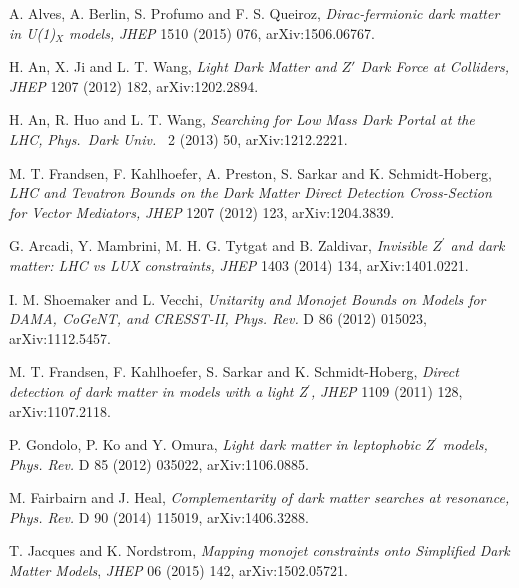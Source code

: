  A. Alves, A. Berlin, S. Profumo and F. S. Queiroz,
\emph{Dirac-fermionic dark matter in U(1)$_{X}$ models,}
  \emph{JHEP} 1510 (2015) 076,
  arXiv:1506.06767. %

 H. An, X. Ji and L. T. Wang,
   \emph{Light Dark Matter and $Z'$ Dark Force at Colliders,}
    \emph{JHEP} 1207 (2012) 182, arXiv:1202.2894.

 H. An, R. Huo and L. T. Wang,
\emph{Searching for Low Mass Dark Portal at the LHC,}
  \emph{Phys.\ Dark Univ.\ } 2 (2013) 50,
  arXiv:1212.2221. %

 M. T. Frandsen, F. Kahlhoefer, A. Preston, S. Sarkar and K. Schmidt-Hoberg,
\emph{LHC and Tevatron Bounds on the Dark Matter Direct Detection Cross-Section for Vector Mediators,}
  \emph{JHEP} 1207 (2012) 123,
  arXiv:1204.3839. %

 G. Arcadi, Y. Mambrini, M. H. G. Tytgat and B. Zaldivar,
\emph{Invisible $Z^\prime$ and dark matter: LHC vs LUX constraints,}
  \emph{JHEP} 1403 (2014) 134,
  arXiv:1401.0221. %

 I. M. Shoemaker and L. Vecchi,
\emph{Unitarity and Monojet Bounds on Models for DAMA, CoGeNT, and CRESST-II,}
  \emph{Phys. Rev.} D 86 (2012) 015023,
  arXiv:1112.5457. %

 M. T. Frandsen, F. Kahlhoefer, S. Sarkar and K. Schmidt-Hoberg,
\emph{Direct detection of dark matter in models with a light Z$^{\prime}$,}
  \emph{JHEP} 1109 (2011) 128,
  arXiv:1107.2118. %

 P. Gondolo, P. Ko and Y. Omura,
\emph{Light dark matter in leptophobic Z$^{\prime}$ models,}
  \emph{Phys. Rev.} D 85 (2012) 035022,
  arXiv:1106.0885. %

 M. Fairbairn and J. Heal,
\emph{Complementarity of dark matter searches at resonance,}
  \emph{Phys. Rev.} D 90 (2014) 115019,
  arXiv:1406.3288. %


 T. Jacques and K. Nordstrom, \emph{Mapping monojet constraints onto Simplified Dark Matter Models}, \emph{JHEP} 06 (2015) 142, arXiv:1502.05721.


